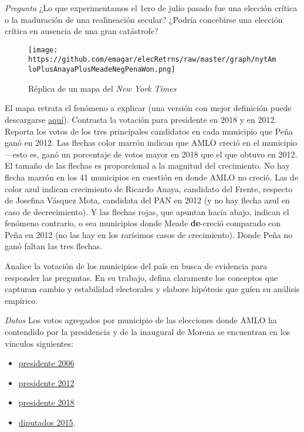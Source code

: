 \documentclass{article}
\author{eric}
\date{\today}
\title{}
\begin{document}
\emph{Pregunta} ¿Lo que experimentamos el 1ero de julio pasado fue una elección crítica o la maduración de una realineación secular? ¿Podría concebirse una elección crítica en ausencia de una gran catástrofe?

\begin{figure}[htbp]
\centering
\texttt{[image: https://github.com/emagar/elecRetrns/raw/master/graph/nytAmloPlusAnayaPlusMeadeNegPenaWon.png]}
\caption{\label{fig:org031f576}
Réplica de un mapa del \emph{New York Times}}
\end{figure}

El mapa retrata el fenómeno a explicar (una versión con mejor definición puede descargarse \href{https://github.com/emagar/elecRetrns/raw/master/graph/nytAmloPlusAnayaPlusMeadeNegPenaWon.pdf}{aquí}). Contrasta la votación para presidente en 2018 y en 2012. Reporta los votos de los tres principales candidatos en cada municipio que Peña ganó en 2012. Las flechas color marrón indican que AMLO creció en el municipio---esto es, ganó un porcentaje de votos mayor en 2018 que el que obtuvo en 2012. El tamaño de las flechas es proporcional a la magnitud del crecimiento. No hay flecha marrón en los 41 municipios en cuestión en donde AMLO no creció. Las de color azul indican crecimiento de Ricardo Anaya, candidato del Frente, respecto de Josefina Vásquez Mota, candidata del PAN en 2012 (y no hay flecha azul en caso de decrecimiento). Y las flechas rojas, que apuntan hacia abajo, indican el fenómeno contrario, o sea municipios donde Meade \textbf{de}-creció comparado con Peña en 2012 (no las hay en los rarísimos casos de crecimiento). Donde Peña no ganó faltan las tres flechas.

Analice la votación de los municipios del país en busca de evidencia para responder las preguntas. En su trabajo, defina claramente los conceptos que capturan  cambio y estabilidad electorales y elabore hipótesis que guíen su análisis empírico.

\emph{Datos} Los votos agregados por municipio de las elecciones donde AMLO ha contendido por la presidencia y de la inaugural de Morena se encuentran en los vínculos siguientes:

\begin{itemize}
\item \href{https://raw.githubusercontent.com/emagar/elecRetrns/7b4dd5f4ecfea11469e617ecabb243fa15bb8c19/data/municipios/pre2006.csv}{presidente 2006}
\item \href{https://raw.githubusercontent.com/emagar/elecRetrns/7b4dd5f4ecfea11469e617ecabb243fa15bb8c19/data/municipios/pre2012.csv}{presidente 2012}
\item \href{https://raw.githubusercontent.com/emagar/elecRetrns/7b4dd5f4ecfea11469e617ecabb243fa15bb8c19/data/municipios/pre2018.csv}{presidente 2018}
\item \href{https://raw.githubusercontent.com/emagar/elecRetrns/7b4dd5f4ecfea11469e617ecabb243fa15bb8c19/data/municipios/dip2015.csv}{diputados 2015}.
\end{itemize}
\end{document}
